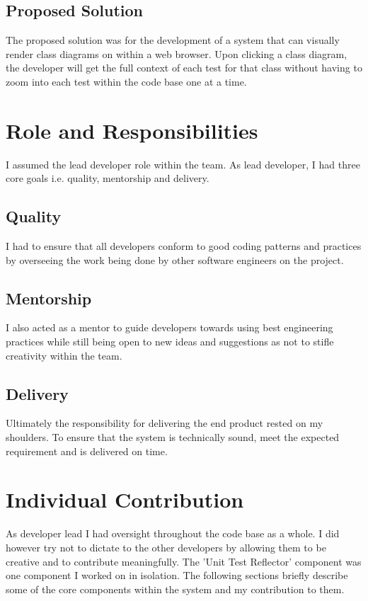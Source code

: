 \documentclass[a4paper,12pt]{article}
\begin{document}
\subsection{Proposed Solution}
The proposed solution was for the development of a system that can visually render class diagrams on within a web browser. Upon clicking a class diagram, the developer will get the full context of each test for that class without having to zoom into each test within the code base one at a time. 


\section{Role and Responsibilities}
I assumed the lead developer role within the team. As lead developer, I had three core goals i.e. quality, mentorship and delivery.


\subsection{Quality} 
I had to ensure that all developers conform to good coding patterns and practices by overseeing the work being done by other software engineers on the project.
\subsection{Mentorship} 
I also acted as a mentor to guide developers towards using best engineering practices while still being open to new ideas and suggestions as not to stifle creativity within the team.
\subsection{Delivery} 
Ultimately the responsibility for delivering the end product rested on my shoulders. To ensure that the system is technically sound, meet the expected requirement and is delivered on time. 



\section{Individual Contribution}
As developer lead I had oversight throughout the code base as a whole. I did however try not to dictate to the other developers by allowing them to be creative and to contribute meaningfully. The 'Unit Test Reflector' component was one component I worked on in isolation. The following sections briefly describe some of the core components within the system and my contribution to them.
 
\end{document}
